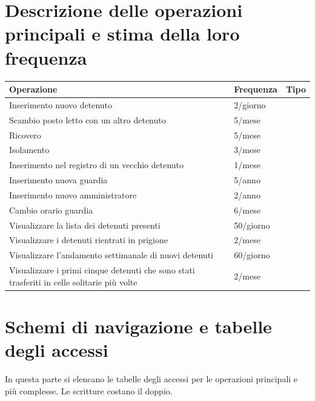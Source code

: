 \documentclass[a4paper,12pt]{report}
\begin{document}
\section{Descrizione delle operazioni principali e stima della loro frequenza}
\begin{table}[H]
\begin{tabular}{p{9cm} p{2cm} p{1cm}}
\hline
Operazione & Frequenza & Tipo \\ \hline
Inserimento nuovo detenuto & 2/giorno &  \\
Scambio posto letto con un altro detenuto & 5/mese &  \\
Ricovero & 5/mese & \\
Isolamento & 3/mese & \\
Inserimento nel registro di un vecchio detenuto & 1/mese & \\
Inserimento nuova guardia & 5/anno & \\
Inserimento nuovo amministratore & 2/anno & \\
Cambio orario guardia & 6/mese & \\
Visualizzare la lista dei detenuti presenti & 50/giorno & \\
Visualizzare i detenuti rientrati in prigione & 2/mese & \\
Visualizzare l'andamento settimanale di nuovi detenuti & 60/giorno & \\
Visualizzare i primi cinque detenuti che sono stati trasferiti in celle solitarie più volte & 2/mese &
\end{tabular}
\end{table}
\section{Schemi di navigazione e tabelle degli accessi}
In questa parte si elencano le tabelle degli accessi per le operazioni principali e più complesse.
%
Le scritture costano il doppio.
\end{document}
